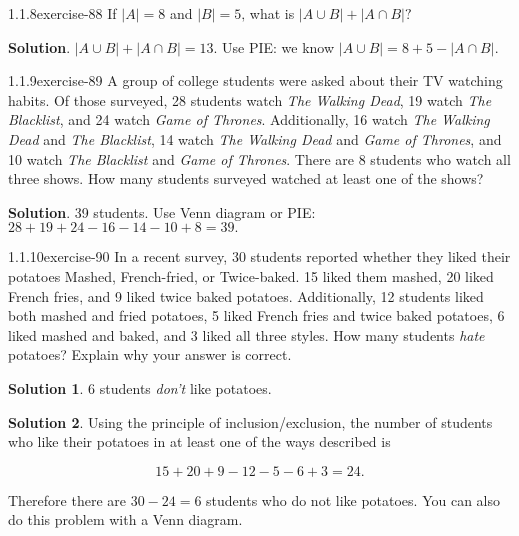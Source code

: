 \documentclass[twoside,11pt,]{book}
\numberwithin{equation}{chapter}
\newcommand{\card}[1]{\left| #1 \right|}
\begin{document}
\begin{divisionsolution}{1.1.8}{}{exercise-88}%
\hypertarget{p-1393}{}%
If \(\card{A} = 8\) and \(\card{B} = 5\text{,}\) what is \(\card{A \cup B} + \card{A \cap B}\text{?}\)%
\par\smallskip%
\noindent\textbf{Solution}.\quad%
\hypertarget{p-1395}{}%
\(\card{A \cup B} + \card{A \cap B} = 13\text{.}\) Use PIE: we know \(\card{A \cup B} = 8 + 5 - \card{A \cap B}\text{.}\)%
\end{divisionsolution}%
\begin{divisionsolution}{1.1.9}{}{exercise-89}%
\hypertarget{p-1399}{}%
A group of college students were asked about their TV watching habits. Of those surveyed, 28 students watch \emph{The Walking Dead}, 19 watch \emph{The Blacklist}, and 24 watch \emph{Game of Thrones}. Additionally, 16 watch \emph{The Walking Dead} and \emph{The Blacklist}, 14 watch \emph{The Walking Dead} and \emph{Game of Thrones}, and 10 watch \emph{The Blacklist} and \emph{Game of Thrones}. There are 8 students who watch all three shows. How many students surveyed watched at least one of the shows?%
\par\smallskip%
\noindent\textbf{Solution}.\quad%
\hypertarget{p-1401}{}%
39 students. Use Venn diagram or PIE: \(28 + 19 + 24 - 16 - 14 - 10 + 8 = 39\text{.}\)%
\end{divisionsolution}%
\begin{divisionsolution}{1.1.10}{}{exercise-90}%
\hypertarget{p-1407}{}%
In a recent survey, 30 students reported whether they liked their potatoes Mashed, French-fried, or Twice-baked. 15 liked them mashed, 20 liked French fries, and 9 liked twice baked potatoes. Additionally, 12 students liked both mashed and fried potatoes, 5 liked French fries and twice baked potatoes, 6 liked mashed and baked, and 3 liked all three styles. How many students \emph{hate} potatoes? Explain why your answer is correct.%
\par\smallskip%
\noindent\textbf{Solution 1}.\quad%
\hypertarget{p-1409}{}%
6 students \emph{don't} like potatoes.%
\par\smallskip%
\noindent\textbf{Solution 2}.\quad%
\hypertarget{p-1410}{}%
Using the principle of inclusion/exclusion, the number of students who like their potatoes in at least one of the ways described is%
\par
\hypertarget{p-1411}{}%
%
\begin{equation*}
15 + 20 + 9 - 12 - 5 - 6 + 3 = 24
\text{.}
\end{equation*}
%
\par
\hypertarget{p-1412}{}%
Therefore there are \(30-24 = 6\) students who do not like potatoes. You can also do this problem with a Venn diagram.%
\end{divisionsolution}%
\end{document}
